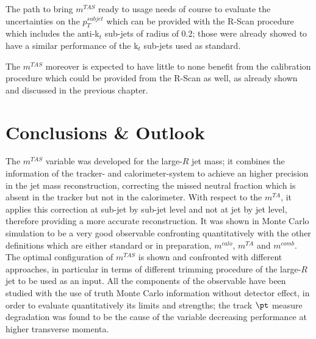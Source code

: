 \documentclass[UKenglish,texlive=2013]{\ATLASLATEXPATH atlasdoc}
\newcommand{\mta}{m^{TA}}
\newcommand{\mtas}{m^{TAS}}
\newcommand{\mcal}{m^{calo}}
\newcommand{\mcomb}{m^{comb}}
\newcommand{\iqr}{\frac{1}{2}\: \times\: 68\% \:\textrm{IQnR/median}}
\begin{document}
The path to bring $\mtas$ ready to usage needs of course to evaluate the uncertainties on the  $p_T^{subjet}$ which can be provided with the R-Scan procedure which includes the anti-k$_t$ sub-jets of radius of 0.2; those were already showed to have a similar performance of the k$_t$ sub-jets used as standard.

The $\mtas$ moreover is expected to have little to none benefit from the calibration procedure which could be provided from the R-Scan as well, as already shown and discussed in the previous chapter. 





\clearpage
\section{Conclusions \& Outlook}
\label{sec:conclusions}
The $\mtas$ variable was developed for the large-$R$ jet mass; it combines the information of the tracker- and calorimeter-system to achieve an higher precision in the jet mass reconstruction, correcting the missed neutral fraction which is absent in the tracker but not in the calorimeter.
With respect to the $\mta$, it applies this correction at sub-jet by sub-jet level and not at jet by jet level, therefore providing a more accurate reconstruction. 
It was shown in Monte Carlo simulation to be a very good observable confronting quantitatively with the other definitions which are either standard or in preparation, $\mcal$, $\mta$ and $\mcomb$.
The optimal configuration of $\mtas$ is shown and confronted with different approaches, in particular in terms of different trimming procedure of the large-$R$ jet to be used as an input.
All the components of the observable have been studied with the use of truth Monte Carlo information without detector effect, in order to evaluate quantitatively its limits and strengths; the track $\pt$ measure degradation was found to be the cause of the variable decreasing performance at higher transverse momenta.
\end{document}
